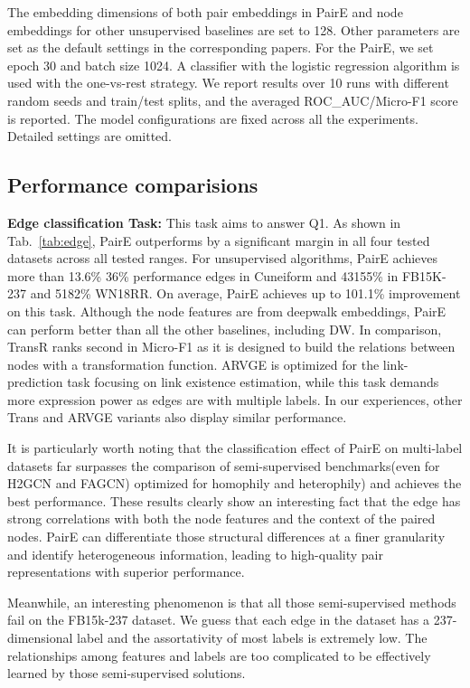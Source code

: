 \documentclass[10pt,journal,compsoc]{IEEEtran}
\begin{document}
The embedding dimensions of both pair embeddings in PairE and node embeddings for other unsupervised baselines are set to 128. Other parameters are set as the default settings in the corresponding papers. For the PairE, we set epoch 30 and batch size 1024. A classifier with the logistic regression algorithm is used with the one-vs-rest strategy. We report results over 10 runs with different random seeds and train/test splits, and the averaged ROC\_AUC/Micro-F1 score is reported. The model configurations are fixed across all the experiments. Detailed settings are omitted. 

\subsection{Performance comparisions}
\label{sec:results}
   
\noindent\textbf{Edge classification Task:} This task aims to answer Q1. As shown in Tab.~\ref{tab:edge}, PairE outperforms by a significant margin in all four tested datasets across all tested ranges. For unsupervised algorithms, PairE achieves more than 13.6\% 36\% performance edges in Cuneiform and 43155\% in FB15K-237 and 5182\% WN18RR. On average, PairE achieves up to 101.1\% improvement on this task. Although the node features are from deepwalk embeddings, PairE can perform better than all the other baselines, including DW.
In comparison, TransR ranks second in Micro-F1 as it is designed to build the relations between nodes with a transformation function. ARVGE is optimized for the link-prediction task focusing on link existence estimation, while this task demands more expression power as edges are with multiple labels. In our experiences, other Trans and ARVGE variants also display similar performance.

It is particularly worth noting that the classification effect of PairE on multi-label datasets far surpasses the comparison of semi-supervised benchmarks(even for H2GCN and FAGCN) optimized for homophily and heterophily) and achieves the best performance. 
These results clearly show an interesting fact that the edge has strong correlations with both the node features and the context of the paired nodes. PairE can differentiate those structural differences at a finer granularity and identify heterogeneous information, leading to high-quality pair representations with superior performance. 

Meanwhile, an interesting phenomenon is that all those semi-supervised methods fail on the FB15k-237 dataset. We guess that each edge in the dataset has a 237-dimensional label and the assortativity of most labels is extremely low. The relationships among features and labels are too complicated to be effectively learned by those semi-supervised solutions. 
\end{document}
